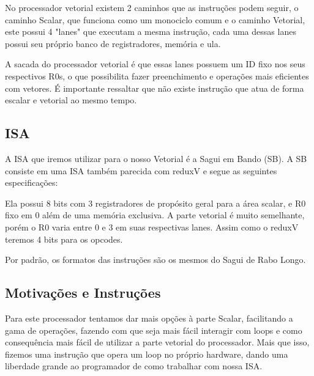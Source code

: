 \documentclass{article}
\begin{document}
    No processador vetorial existem 2 caminhos que as instruções podem seguir, o caminho Scalar, que funciona como um monociclo comum e o caminho Vetorial, este possui 4 "lanes" que executam a mesma instrução, cada uma dessas lanes possui seu próprio banco de registradores, memória e ula.

    A sacada do processador vetorial é que essas lanes possuem um ID fixo nos seus respectivos R0s, o que possibilita fazer preenchimento e operações mais eficientes com vetores.
    É importante ressaltar que não existe instrução que atua de forma escalar e vetorial ao mesmo tempo.

    \subsection{ISA}

    A ISA que iremos utilizar para o nosso Vetorial é a Sagui em Bando (SB).
    A SB consiste em uma ISA também parecida com reduxV e segue as seguintes especificações:

    Ela possui 8 bits com 3 registradores de propósito geral para a área scalar, e R0 fixo em 0 além de uma memória exclusiva. A parte vetorial é muito semelhante, porém o R0 varia entre 0 e 3 em suas respectivas lanes.
    Assim como o reduxV teremos 4 bits para os opcodes.
    
    Por padrão, os formatos das instruções são os mesmos do Sagui de Rabo Longo.

    \subsection{Motivações e Instruções}

    Para este processador tentamos dar mais opções à parte Scalar, facilitando a gama de operações, fazendo com que seja mais fácil interagir com loops e como consequência mais fácil de utilizar a parte vetorial do processador.
    Mais que isso, fizemos uma instrução que opera um loop no próprio hardware, dando uma liberdade grande ao programador de como trabalhar com nossa ISA.
\end{document}
